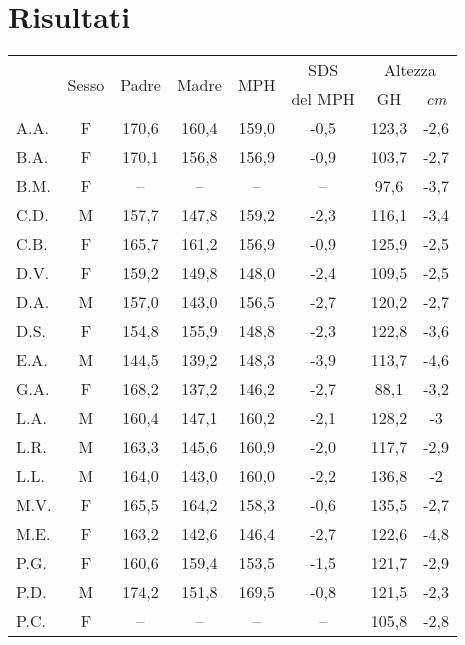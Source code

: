 \chapter{Risultati}

\begin{table}[!h]
\begin{center}
\begin{tabular}{lccccccc}
\toprule
 & \multirow{2}{*}{Sesso} & 
   \multirow{2}{*}{Padre} & 
   \multirow{2}{*}{Madre} & 
   \multirow{2}{*}{MPH} & 
   SDS  & 
   
   \multicolumn{2}{c}{Altezza} \\
 \cmidrule(r){7-8}
 & &   	& & & del MPH &		GH				& \emph{cm}             	 \\
\midrule
A.A.	& F & 170,6 & 160,4 & 159,0 & -0,5 	 		& 123,3 & -2,6  \\
B.A.	& F & 170,1 & 156,8 & 156,9 & -0,9   			& 103,7 & -2,7   \\
B.M.	& F & --    & --    & --    & --     			&  97,6 & -3,7  \\
C.D.	& M & 157,7 & 147,8 & 159,2 & -2,3 	        	& 116,1 & -3,4  \\
C.B.	& F & 165,7 & 161,2 & 156,9 & -0,9 	 	        & 125,9 & -2,5  \\
D.V.	& F & 159,2 & 149,8 & 148,0 & -2,4   			& 109,5 & -2,5   \\
D.A.	& M & 157,0 & 143,0 & 156,5 & -2,7 	  		& 120,2 & -2,7  \\
D.S.	& F & 154,8 & 155,9 & 148,8 & -2,3   			& 122,8 & -3,6  \\
E.A.	& M & 144,5 & 139,2 & 148,3 & -3,9 	  		& 113,7 & -4,6  \\
G.A.	& F & 168,2 & 137,2 & 146,2 & -2,7 	  		&  88,1 & -3,2  \\
L.A.	& M & 160,4 & 147,1 & 160,2 & -2,1   			& 128,2 & -3    \\
L.R.	& M & 163,3 & 145,6 & 160,9 & -2,0 	  		& 117,7 & -2,9  \\
L.L.	& M & 164,0 & 143,0 & 160,0 & -2,2 	  		& 136,8 & -2     \\
M.V.	& F & 165,5 & 164,2 & 158,3 & -0,6   			& 135,5 & -2,7  \\
M.E.	& F & 163,2 & 142,6 & 146,4 & -2,7 	  		& 122,6 & -4,8  \\
P.G.	& F & 160,6 & 159,4 & 153,5 & -1,5   			& 121,7 & -2,9  \\
P.D.	& M & 174,2 & 151,8 & 169,5 & -0,8 	  		& 121,5 & -2,3  \\
P.C.	& F & --    & --    & --    & --   	  		& 105,8 & -2,8   \\

\end{tabular}
\end{center}
\end{table}
